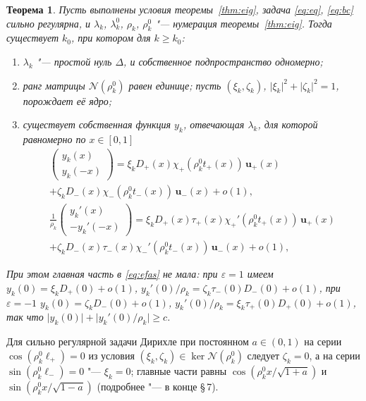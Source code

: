 \documentclass[12pt,a4paper]{article}
\numberwithin{equation}{section}
\newtheorem{theorem}{Теорема}
\theoremstyle{definition}
\newcommand{\abs}[1]{\lvert#1\rvert}
\newcommand{\Mm}{\mathcal N}
\begin{document}
\begin{theorem}\label{thm:ef}
Пусть выполнены условия теоремы~\ref{thm:eig}, задача \eqref{eq:eq}, \eqref{eq:bc} сильно
регулярна, и $\lambda_k$, $\lambda_k^0$, $\rho_k$, $\rho_k^0$ "--- нумерация теоремы~\ref{thm:eig}.
Тогда существует $k_0$, при котором для $k\ge k_0$:
\begin{enumerate}
\item[(a)] $\lambda_k$ "--- простой нуль $\Delta$, и собственное подпространство одномерно;
\item[(b)] ранг матрицы $\Mm(\rho_k^0)$ равен единице; пусть $(\xi_k,\zeta_k)$,
 $\abs{\xi_k}^2+\abs{\zeta_k}^2=1$, порождает её ядро;
\item[(c)] существует собственная функция $y_k$, отвечающая $\lambda_k$, для которой равномерно по
 $x\in[0,1]$
 \begin{equation}\label{eq:efas}
 \begin{gathered}
  \begin{pmatrix}y_k(x)\\ y_k(-x)\end{pmatrix}
  =\xi_kD_+(x)\chi_+(\rho_k^0t_+(x))\,\mathbf u_+(x)\\
  +\zeta_kD_-(x)\chi_-(\rho_k^0t_-(x))\,\mathbf u_-(x)+o(1),\\
  \frac1{\rho_k}\begin{pmatrix}y_k'(x)\\ -y_k'(-x)\end{pmatrix}
  =\xi_kD_+(x)\tau_+(x)\chi_+'(\rho_k^0t_+(x))\,\mathbf u_+(x)\\
  +\zeta_kD_-(x)\tau_-(x)\chi_-'(\rho_k^0t_-(x))\,\mathbf u_-(x)+o(1),
 \end{gathered}
 \end{equation}
\end{enumerate}
При этом главная часть в \eqref{eq:efas} не мала: при $\varepsilon=1$ имеем
$y_k(0)=\xi_kD_+(0)+o(1)$, $y_k'(0)/\rho_k=\zeta_k\tau_-(0)D_-(0)+o(1)$, при $\varepsilon=-1$
$y_k(0)=\zeta_kD_-(0)+o(1)$, $y_k'(0)/\rho_k=\xi_k\tau_+(0)D_+(0)+o(1)$, так что
$\abs{y_k(0)}+\abs{y_k'(0)/\rho_k}\ge c$.
\end{theorem}

Для сильно регулярной задачи Дирихле при постоянном $a\in(0,1)$ на серии
$\cos(\rho_k^0\ell_+)=0$ из условия $(\xi_k,\zeta_k)\in\ker\Mm(\rho_k^0)$ следует $\zeta_k=0$, а на
серии $\sin(\rho_k^0\ell_-)=0$ "--- $\xi_k=0$; главные части равны $\cos(\rho_k^0x/\sqrt{1+a})$ и
$\sin(\rho_k^0x/\sqrt{1-a})$ (подробнее "--- в конце \S\,7).
\end{document}
